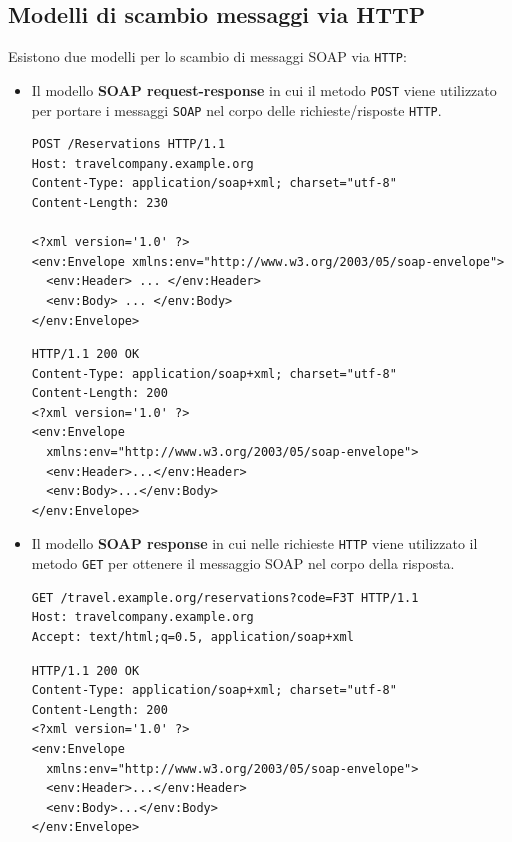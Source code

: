 \subsection{Modelli di scambio messaggi via HTTP}
Esistono due modelli per lo scambio di messaggi SOAP via \texttt{HTTP}:
\begin{itemize}
    \item Il modello \textbf{SOAP request-response} in cui il metodo \texttt{POST} viene utilizzato per portare i messaggi \texttt{SOAP} nel corpo delle richieste/risposte \texttt{HTTP}.

    \begin{tcolorbox}[breakable,title={Esempio di request-response}]
        \begin{lstlisting}[caption={Richiesta HTTP}]
POST /Reservations HTTP/1.1
Host: travelcompany.example.org
Content-Type: application/soap+xml; charset="utf-8"
Content-Length: 230

<?xml version='1.0' ?>
<env:Envelope xmlns:env="http://www.w3.org/2003/05/soap-envelope">
  <env:Header> ... </env:Header>
  <env:Body> ... </env:Body>
</env:Envelope>
        \end{lstlisting}
        \begin{lstlisting}[caption={Risposta HTTP}]
HTTP/1.1 200 OK
Content-Type: application/soap+xml; charset="utf-8"
Content-Length: 200
<?xml version='1.0' ?>
<env:Envelope
  xmlns:env="http://www.w3.org/2003/05/soap-envelope">
  <env:Header>...</env:Header>
  <env:Body>...</env:Body>
</env:Envelope>
        \end{lstlisting}
    \end{tcolorbox}
    \item Il modello \textbf{SOAP response} in cui nelle richieste \texttt{HTTP} viene utilizzato il metodo \texttt{GET} per ottenere il messaggio SOAP nel corpo della risposta.

    \begin{tcolorbox}[breakable, title={Esempio di response}]
        \begin{lstlisting}[caption={Richiesta HTTP}]
GET /travel.example.org/reservations?code=F3T HTTP/1.1
Host: travelcompany.example.org
Accept: text/html;q=0.5, application/soap+xml
        \end{lstlisting}
        \begin{lstlisting}[caption={Risposta HTTP}]
HTTP/1.1 200 OK
Content-Type: application/soap+xml; charset="utf-8"
Content-Length: 200
<?xml version='1.0' ?>
<env:Envelope
  xmlns:env="http://www.w3.org/2003/05/soap-envelope">
  <env:Header>...</env:Header>
  <env:Body>...</env:Body>
</env:Envelope>
        \end{lstlisting}
    \end{tcolorbox}
\end{itemize}

